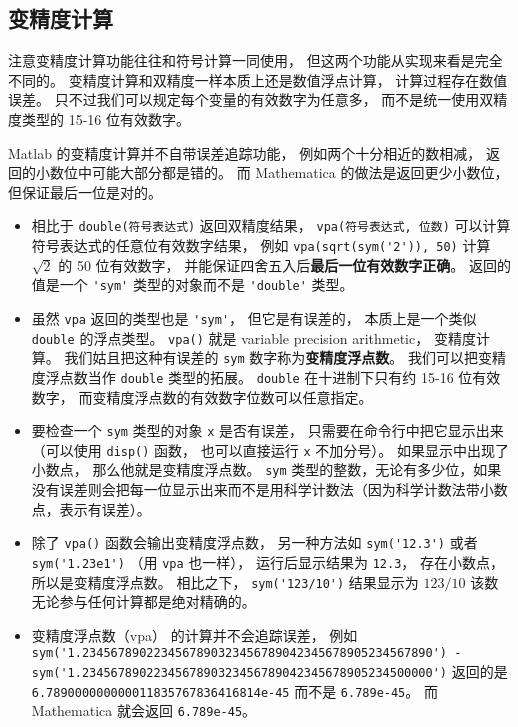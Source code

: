 \subsection{变精度计算}
注意变精度计算功能往往和符号计算一同使用， 但这两个功能从实现来看是完全不同的。 变精度计算和双精度一样本质上还是数值浮点计算， 计算过程存在数值误差。 只不过我们可以规定每个变量的有效数字为任意多， 而不是统一使用双精度类型的 15-16 位有效数字。

Matlab 的变精度计算并不自带误差追踪功能， 例如两个十分相近的数相减， 返回的小数位中可能大部分都是错的。 而 Mathematica 的做法是返回更少小数位， 但保证最后一位是对的。

\begin{itemize}
\item 相比于 \verb`double(符号表达式)` 返回双精度结果， \verb`vpa(符号表达式, 位数)` 可以计算符号表达式的任意位有效数字结果， 例如 \verb`vpa(sqrt(sym('2')), 50)` 计算 $\sqrt{2}$ 的 50 位有效数字， 并能保证四舍五入后\textbf{最后一位有效数字正确}。 返回的值是一个 \verb`'sym'` 类型的对象而不是 \verb`'double'` 类型。

\item 虽然 \verb`vpa` 返回的类型也是 \verb`'sym'`， 但它是有误差的， 本质上是一个类似 \verb`double` 的浮点类型。 \verb`vpa()` 就是 variable precision arithmetic， 变精度计算。 我们姑且把这种有误差的 \verb`sym` 数字称为\textbf{变精度浮点数}。 我们可以把变精度浮点数当作 \verb`double` 类型的拓展。 \verb`double` 在十进制下只有约 15-16 位有效数字， 而变精度浮点数的有效数字位数可以任意指定。

\item 要检查一个 \verb`sym` 类型的对象 \verb`x` 是否有误差， 只需要在命令行中把它显示出来（可以使用 \verb`disp()` 函数， 也可以直接运行 \verb`x` 不加分号）。 如果显示中出现了小数点， 那么他就是变精度浮点数。 \verb`sym` 类型的整数，无论有多少位，如果没有误差则会把每一位显示出来而不是用科学计数法（因为科学计数法带小数点，表示有误差）。

\item 除了 \verb`vpa()` 函数会输出变精度浮点数， 另一种方法如 \verb`sym('12.3')` 或者 \verb`sym('1.23e1')` （用 \verb`vpa` 也一样）， 运行后显示结果为 \verb`12.3`， 存在小数点， 所以是变精度浮点数。 相比之下， \verb`sym('123/10')` 结果显示为 $123/10$ 该数无论参与任何计算都是绝对精确的。

\item 变精度浮点数（vpa） 的计算并不会追踪误差， 例如 \verb`sym('1.2345678902234567890323456789042345678905234567890') - sym('1.2345678902234567890323456789042345678905234500000')` 返回的是 \verb`6.789000000000011835767836416814e-45` 而不是 \verb`6.789e-45`。 而 Mathematica 就会返回 \verb`6.789e-45`。


\end{itemize}

